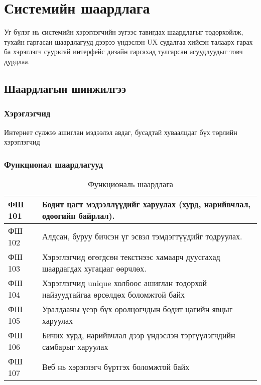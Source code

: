 \chapter{Системийн шаардлага}

Уг бүлэг нь системийн хэрэглэгчийн зүгээс тавигдах шаардлагыг тодорхойлж, тухайн гаргасан шаардлагууд дээрээ үндэслэн UX судалгаа хийсэн талаарх гарах ба хэрэглэгч суурьтай интерфейс дизайн гаргахад тулгарсан асуудлуудыг товч дурдлаа.

\section{Шаардлагын шинжилгээ}

\subsection{Хэрэглэгчид}

Интернет сүлжээ ашиглан мэдээлэл авдаг, бусадтай хуваалцдаг бүх төрлийн хэрэглэгчид 

\subsection{Функционал шаардлагууд}

\begin{table}[h]
	\centering
	\caption{Функциональ шаардлага}
	\begin{tabular}{ |p{2cm}|p{13cm}| }
		\hline
		ФШ 101 & Бодит цагт мэдээллүүдийг харуулах (хурд, нарийвчлал, одоогийн байрлал).           \\ \hline
		ФШ 102 & Алдсан, буруу бичсэн үг эсвэл тэмдэгтүүдийг тодруулах.                            \\ \hline
		ФШ 103 & Хэрэглэгчид өгөгдсөн текстнээс хамаарч дуусгахад шаардагдах хугацааг өөрчлөх.     \\ \hline
		ФШ 104 & Хэрэглэгчид unique холбоос ашиглан тодорхой найзуудтайгаа өрсөлдөх боломжтой байх \\ \hline
		ФШ 105 & Уралдааны үеэр бүх оролцогчдын бодит цагийн явцыг харуулах                        \\ \hline
		ФШ 106 & Бичих хурд, нарийвчлал дээр үндэслэн тэргүүлэгчдийн самбарыг харуулах             \\  \hline
		ФШ 107 & Веб нь хэрэглэгч бүртгэх боломжтой байх                                           \\ \hline
	\end{tabular}
\end{table}

